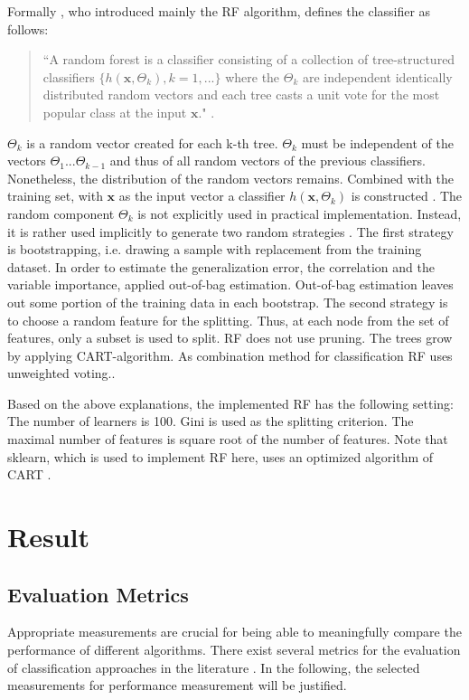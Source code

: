 \documentclass[12pt, a4paper, titlepage]{article}
\begin{document}
Formally \citet{breiman2001}, who introduced mainly the \ac{RF} algorithm, defines the classifier as follows:

\begin{quote}
``A random forest is a classifier consisting of a collection of tree-structured classifiers $\{h(\textbf{x}, \Theta_k), k = 1, ...\}$ where the ${\Theta_k}$ are independent identically distributed random vectors and each tree casts a unit vote for the most popular class at the input $\textbf{x}$." \citep[6]{breiman2001}. 
\end{quote}
$\Theta_k$ is a random vector created for each k-th tree. $\Theta_k$ must be independent of the vectors $\Theta_1...\Theta_{k-1}$ and thus of all random vectors of the previous classifiers. Nonetheless, the distribution of the random vectors remains. Combined with the training set, with $\textbf{x}$ as the input vector a classifier $h(\textbf{x}, \Theta_k)$ is constructed \citep{breiman2001}. The random component $\Theta_k$ is not explicitly used in practical implementation. Instead, it is rather used implicitly to generate two random strategies \citep{cutler2012}. The first strategy is bootstrapping, i.e. drawing a sample with replacement from the training dataset. In order to estimate the generalization error, the correlation and the variable importance, \citet{breiman2001} applied out-of-bag estimation. Out-of-bag estimation leaves out some portion of the training data in each bootstrap. The second strategy is to choose a random feature for the splitting. Thus, at each node from the set of features, only a subset is used to split. \ac{RF} does not use pruning. The trees grow by applying \ac{CART}-algorithm. As combination method for classification \ac{RF} uses unweighted voting.\citep{cutler2012}.

Based on the above explanations, the implemented \ac{RF} has the following setting: The number of learners is 100. Gini is used as the splitting criterion. The maximal number of features is square root of the number of features. Note that sklearn, which is used to implement \ac{RF} here, uses an optimized algorithm of \ac{CART} \citep{scikit-learn}.

\section{Result}
\subsection{Evaluation Metrics}
Appropriate measurements are crucial for being able to meaningfully compare the performance of different algorithms. There exist several metrics for the evaluation of classification approaches in the literature \citep{Fatourechi2008}. In the following, the selected measurements for performance measurement will be justified. 
\end{document}
